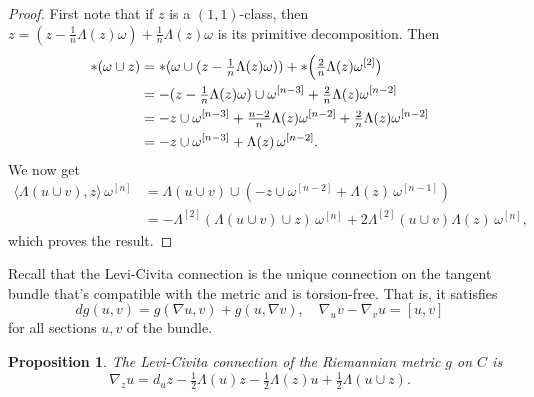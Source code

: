 \documentclass[11pt,a4paper]{amsart}
\newtheorem{prop}[theo]{Proposition}
\theoremstyle{definition}
\theoremstyle{remark}
\def\levi{\nabla}
\def\kf{\omega}
\def\Lef{\Lambda}
\def\ton{u}
\def\ttw{v}
\def\tth{z}
\def\^#1{^{[#1]}}
\def\KC{C}
\begin{document}
\begin{proof}
First note that if $\tth$ is a $(1,1)$-class, then $\tth = (\tth -
\frac1n \Lef(\tth)\kf) + \frac1n \Lef(\tth) \kf$ is its primitive
decomposition. Then
\begin{align*}
*(\kf \cup \tth)
&= *( \kf \cup (\tth - \tfrac1n \Lef(\tth)\kf))
+ * \Bigl( \tfrac{2}{n} \Lef(\tth) \kf\^2 \bigr)
\\
&= -(\tth - \tfrac1n \Lef(\tth)\kf) \cup \kf\^{n-3}
+ \tfrac{2}{n} \Lef(\tth) \kf\^{n-2}
\\
&= -\tth \cup \kf\^{n-3}
+ \tfrac{n-2}{n} \Lef(\tth) \kf\^{n-2}
+ \tfrac{2}{n} \Lef(\tth) \kf\^{n-2}
\\
&= -\tth \cup \kf\^{n-3}
+ \Lef(\tth)\, \kf\^{n-2}.
\end{align*}
We now get
\begin{align*}
\langle \Lef(\ton \cup \ttw), \tth \rangle \,\kf\^n
&= \Lef(\ton \cup \ttw) \cup 
(-\tth \cup \kf\^{n-2} + \Lef(\tth)\, \kf\^{n-1})
\\
&= - \Lef\^2(\Lef(\ton \cup \ttw) \cup \tth) \,\kf\^{n}
+ 2 \Lef\^2(\ton \cup \ttw) \Lef(\tth) \,\kf\^{n},
\end{align*}
which proves the result.
\end{proof}


Recall that the Levi-Civita connection is the unique connection on the tangent
bundle that's compatible with the metric and is torsion-free. That is, it
satisfies
$$
d g(\ton, \ttw) 
= g(\levi \ton, \ttw) + g(\ton, \levi \ttw),
\quad
\levi_{\ton}\ttw - \levi_{\ttw}\ton = [\ton,\ttw]
$$
for all sections $\ton, \ttw$ of the bundle.


\begin{prop}
\label{prop:connection}
The Levi-Civita connection of the Riemannian metric $g$ on $\KC$ is
$$
\levi_{\tth} \ton
=
d_u \tth
-\tfrac12 \Lef(\ton) \tth
-\tfrac12 \Lef(\tth) \ton
+\tfrac12 \Lef(\ton \cup \tth).
$$
\end{prop}
\end{document}
